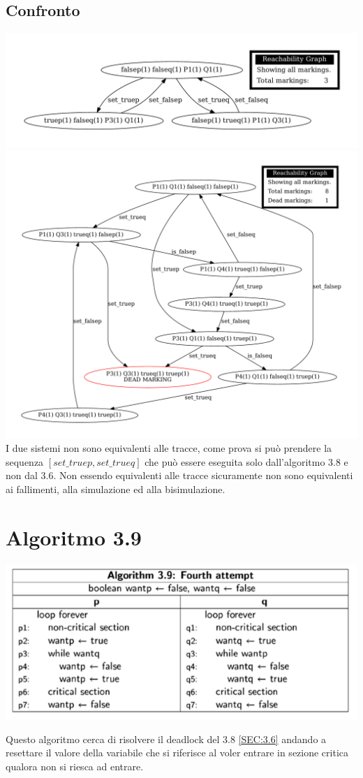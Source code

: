 \documentclass[a4paper]{article}
\begin{document}
\subsection{Confronto}
\includegraphics[width=1\textwidth]{3.6RedRG}
\includegraphics[width=1\textwidth]{3.8RedRG}
I due sistemi non sono equivalenti alle tracce, come prova si può prendere la sequenza $[set\_truep,set\_trueq]$ che può essere eseguita solo dall'algoritmo 3.8 e non dal 3.6.
Non essendo equivalenti alle tracce sicuramente non sono equivalenti ai fallimenti, alla simulazione ed alla bisimulazione.

\newpage
\section{Algoritmo 3.9}
\label{SEC:3.9}
\begin{center}\includegraphics[width=1\textwidth]{3.9.png}\end{center}
Questo algoritmo cerca di risolvere il deadlock del 3.8 \ref{SEC:3.6} andando a resettare il valore della variabile che si riferisce al voler entrare in sezione critica qualora non si riesca ad entrare.
\end{document}
